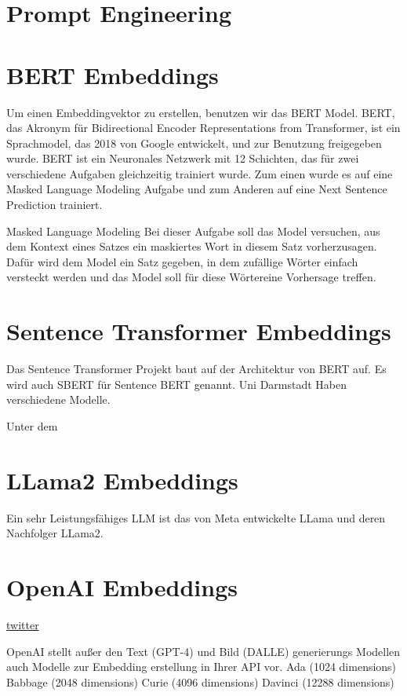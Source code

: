 \section{Prompt Engineering}


\section{BERT Embeddings}

Um einen Embeddingvektor zu erstellen, benutzen wir das BERT Model. BERT, das Akronym für Bidirectional Encoder Representations from Transformer, ist ein Sprachmodel, das 2018 von Google entwickelt, und zur Benutzung freigegeben wurde. 
BERT ist ein Neuronales Netzwerk mit 12 Schichten, das für zwei verschiedene Aufgaben gleichzeitig trainiert wurde. Zum einen wurde es auf eine Masked Language Modeling Aufgabe und zum Anderen auf eine Next Sentence Prediction trainiert. 

Masked Language Modeling
Bei dieser Aufgabe soll das Model versuchen, aus dem Kontext eines Satzes ein maskiertes Wort in diesem Satz vorherzusagen. Dafür wird dem Model ein Satz gegeben, in dem zufällige Wörter einfach versteckt werden und das Model soll für diese Wörtereine Vorhersage treffen. 


\section{Sentence Transformer Embeddings}

Das Sentence Transformer Projekt baut auf der Architektur von BERT auf. 
Es wird auch SBERT für Sentence BERT genannt. 
Uni Darmstadt
Haben verschiedene Modelle.

Unter dem 

\section{LLama2 Embeddings}

Ein sehr Leistungsfähiges LLM ist das von Meta entwickelte LLama und deren Nachfolger LLama2. \cite{touvron2023}

\section{OpenAI Embeddings}

\href{https://twitter.com/Nils_Reimers/status/1487014195568775173}{twitter}



OpenAI stellt außer den Text (GPT-4) und Bild (DALLE) generierungs Modellen auch Modelle zur Embedding erstellung in Ihrer API vor.
Ada (1024 dimensions)
Babbage (2048 dimensions)
Curie (4096 dimensions)
Davinci (12288 dimensions)





